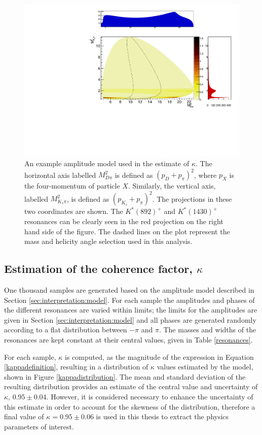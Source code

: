 \begin{figure}[h]
\centering
\includegraphics[width=0.8\linewidth]{figures/results/dalitz.pdf}
\caption{An example amplitude model used in the estimate of $\kappa$. The horizontal axis labelled $M_{D\pi}^2$ is defined as $(p_D + p_{\pi})^2$, where $p_{X}$ is the four-momentum of particle $X$. Similarly, the vertical axis, labelled $M_{K_s\pi}^2$, is defined as $(p_{K_s} + p_{\pi})^2$. The projections in these two coordinates are shown. The $K^*(892)^+$ and $K^*(1430)^+$ resonances can be clearly seen in the red projection on the right hand side of the figure. The dashed lines on the plot represent the \Kstar mass and \KS helicity angle selection used in this analysis.}
\label{dalitzplot}
\end{figure}

\subsection{Estimation of the coherence factor, $\kappa$}
\label{sec:interpretation:kappa}

One thousand samples are generated based on the amplitude model described in Section \ref{sec:interpretation:model}. For each sample the amplitudes and phases of the different resonances are varied within limits; the limits for the amplitudes are given in Section \ref{sec:interpretation:model} and all phases are generated randomly according to a flat distribution between $-\pi$ and $\pi$. The masses and widths of the resonances are kept constant at their central values, given in Table \ref{resonances}. 

For each sample, $\kappa$ is computed, as the magnitude of the expression in Equation \ref{kappadefinition}, resulting in a distribution of $\kappa$ values estimated by the model, shown in Figure \ref{kappadistribution}. The mean and standard deviation of the resulting distribution provides an estimate of the central value and uncertainty of $\kappa$,  $0.95 \pm 0.04$. However, it is considered necessary to enhance the uncertainty of this estimate in order to account for the skewness of the distribution, therefore a final value of $\kappa = 0.95 \pm 0.06$ is used in this thesis to extract the physics parameters of interest.


